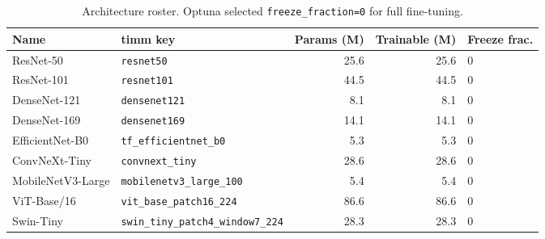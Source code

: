 \begin{table}[htbp]
  \centering
  \small
  \caption{Architecture roster. Optuna selected \texttt{freeze\_fraction=0} for full fine-tuning.}
  \label{tab:model-roster}
  \begin{tabular}{llrrl}
    \toprule
    \textbf{Name} & \textbf{timm key} & \textbf{Params (M)} & \textbf{Trainable (M)} & \textbf{Freeze frac.} \\
    \midrule
    ResNet-50 & \texttt{resnet50} & 25.6 & 25.6 & 0 \\
    ResNet-101 & \texttt{resnet101} & 44.5 & 44.5 & 0 \\
    DenseNet-121 & \texttt{densenet121} & 8.1 & 8.1 & 0 \\
    DenseNet-169 & \texttt{densenet169} & 14.1 & 14.1 & 0 \\
    EfficientNet-B0 & \texttt{tf\_efficientnet\_b0} & 5.3 & 5.3 & 0 \\
    ConvNeXt-Tiny & \texttt{convnext\_tiny} & 28.6 & 28.6 & 0 \\
    MobileNetV3-Large & \texttt{mobilenetv3\_large\_100} & 5.4 & 5.4 & 0 \\
    ViT-Base/16 & \texttt{vit\_base\_patch16\_224} & 86.6 & 86.6 & 0 \\
    Swin-Tiny & \texttt{swin\_tiny\_patch4\_window7\_224} & 28.3 & 28.3 & 0 \\
    \bottomrule
  \end{tabular}
\end{table}
